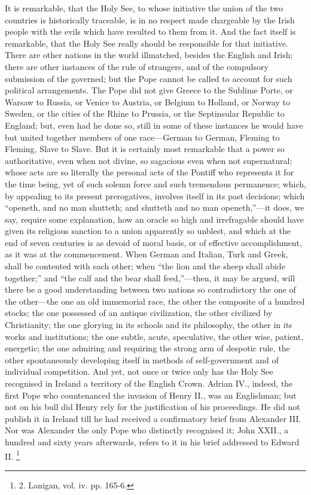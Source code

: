 It is remarkable, that the
Holy See, to whose initiative the union of the two countries is
historically traceable, is in no respect made chargeable by the Irish
people with the evils which have resulted to them from it. And
the fact itself is remarkable, that the Holy See really should be
responsible for that initiative. There are other nations in the world
illmatched, besides the English and Irish; there are other instances
of the rule of strangers, and of the compulsory submission of the
governed; but the Pope cannot be called to account for such political
arrangements. The Pope did not give Greece to the Sublime Porte, or
Warsaw to Russia, or Venice to Austria, or Belgium to Holland, or
Norway to Sweden, or the cities of the Rhine to Prussia, or the
Septinsular Republic to England; but, even had he done so, still in
some of these instances he would have but united together members of
one race—German to German, Fleming to Fleming, Slave to Slave. But
it is certainly most remarkable that a power so authoritative, even
when not divine, so sagacious even when not supernatural; whose acts
are so literally the personal acts of the Pontiff who represents it
for the time being, yet of such solemn force and such tremendous
permanence; which, by appealing to its present prerogatives, involves
itself in its past decisions; which ``openeth, and no man shutteth; and
shutteth and no man openeth,''—it does, we say, require some
explanation, how an oracle so high and irrefragable should have given
its religious sanction to a union apparently so unblest, and which at
the end of seven centuries is as devoid of moral basis, or of
effective accomplishment, as it was at the commencement. When German
and Italian, Turk and Greek, shall be contented with each other; when ``the
lion and the sheep shall abide together;'' and ``the calf and the bear
shall feed,''—then, it may be argued, will there be a good
understanding between two nations so contradictory the one of the
other—the one an old immemorial race, the other the composite of a
hundred stocks; the one possessed of an antique civilization,
the other civilized by Christianity; the one glorying in its schools
and its philosophy, the other in its works and institutions; the one
subtle, acute, speculative, the other wise, patient, energetic; the
one admiring and requiring the strong arm of despotic rule, the other
spontaneously developing itself in methods of self-government and of
individual competition. And yet, not once or twice only has the Holy
See recognised in Ireland a territory of the English Crown. Adrian
IV., indeed, the first Pope who countenanced the invasion of Henry
II., was an Englishman; but not on his bull did Henry rely for the
justification of his proceedings. He did not publish it in Ireland
till he had received a confirmatory brief from Alexander III. Nor was
Alexander the only Pope who distinctly recognised it; John XXII., a
hundred and sixty years afterwards, refers to it in his brief
addressed to Edward II. \footnote{2.
Lanigan, vol. iv. pp. 165-6.}

